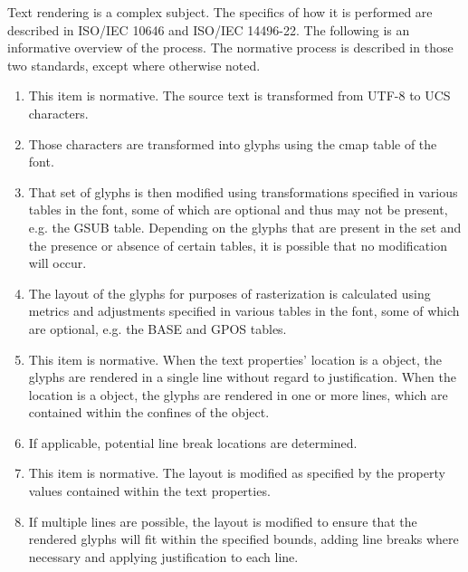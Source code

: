 \pnum
Text rendering is a complex subject. The specifics of how it is performed are described in ISO/IEC 10646 and ISO/IEC 14496-22. The following is an informative overview of the process. The normative process is described in those two standards, except where otherwise noted.


\begin{enumerate}
\item This item is normative. The source text is transformed from UTF-8 to UCS characters.
\item Those characters are transformed into glyphs using the cmap table of the font.
\item That set of glyphs is then modified using transformations specified in various tables in the font, some of which are optional and thus may not be present, e.g. the GSUB table. Depending on the glyphs that are present in the set and the presence or absence of certain tables, it is possible that no modification will occur.
\item The layout of the glyphs for purposes of rasterization is calculated using metrics and adjustments specified in various tables in the font, some of which are optional, e.g. the BASE and GPOS tables.
\item This item is normative. When the text properties' location is a  object, the glyphs are rendered in a single line without regard to justification. When the location is a  object, the glyphs are rendered in one or more lines, which are contained within the confines of the  object.
\item If applicable, potential line break locations are determined.
\item This item is normative. The layout is modified as specified by the property values contained within the text properties.
\item If multiple lines are possible, the layout is modified to ensure that the rendered glyphs will fit within the specified bounds, adding line breaks where necessary and applying justification to each line.

\end{enumerate}
